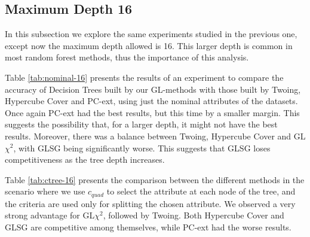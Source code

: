 \subsection{Maximum Depth 16}

In this subsection we explore the same experiments studied in the previous one, except now the maximum depth allowed is 16. This larger depth is common in most random forest methods, thus the importance of this analysis.

Table \ref{tab:nominal-16} presents the results of an experiment to compare the accuracy of  Decision Trees built by our GL-methods with those built by Twoing, Hypercube Cover and PC-ext, using just the nominal attributes of the datasets. Once again PC-ext had the best results, but this time by a smaller margin. This suggests the possibility that, for a larger depth, it might not have the best results. Moreover, there was a balance between Twoing, Hypercube Cover and GL$\chi^2$, with GLSG being significantly worse. This suggests that GLSG loses competitiveness as the tree depth increases.

Table \ref{tab:ctree-16} presents the comparison between the different methods in the scenario where we use $c_{quad}$ to select the attribute at each node of the tree, and the criteria are used only for splitting the chosen attribute. We observed a very strong advantage for GL$\chi^2$, followed by Twoing. Both Hypercube Cover and GLSG are competitive among themselves, while PC-ext had the worse results.

